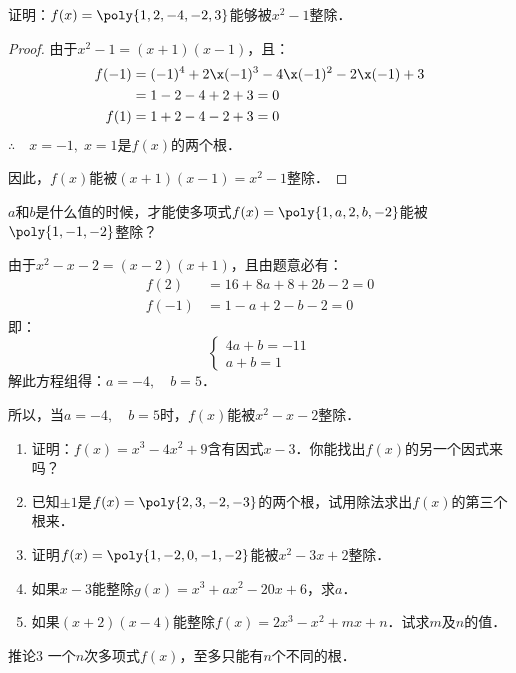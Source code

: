\begin{example}
证明：$f(x)=\poly{1,2,-4,-2,3}$能够被$x^2-1$整除．
\end{example}

\begin{proof}
由于$x^2-1=(x+1)(x-1)$，且：
\[\begin{split}
    f(-1)&=(-1)^4+2\x(-1)^3-4\x(-1)^2-2\x (-1)+3\\
&=1-2-4+2+3=0\\
f(1)&=1+2-4-2+3=0
\end{split}\]
$\therefore\quad x=-1,\; x=1$是$f(x)$的两个根．

因此，$f(x)$能被$(x+1)(x-1)=x^2-1$整除．

\end{proof}

\begin{example}
    $a$和$b$是什么值的时候，才能使多项式$f(x)=\poly{1,a,2,b,-2}$能被$\poly{1,-1,-2}$整除？
\end{example}

\begin{solution}
由于$x^2-x-2=(x-2)(x+1)$，且由题意必有：
\[\begin{split}
    f(2) &= 16+8a+8+2b-2=0\\
    f(-1)&=1-a+2-b-2=0
\end{split}\]
即：\[\begin{cases}
    4a+b=-11\\
    a+b=1
\end{cases}\]
解此方程组得：$a=-4,\quad b=5$．

所以，当$a=-4,\quad b=5$时，$f(x)$能被$x^2-x-2$整除．
\end{solution}

\begin{ex}
\begin{enumerate}
    \item 证明：$f(x)=x^3-4x^2+9$含有因式$x-3$．你能找出$f(x)$的另一个因式来吗？
    \item 已知$\pm 1$是$f(x)=\poly{2,3,-2,-3}$的两个根，试用除法求出$f(x)$的第三个根来．
    \item 证明$f(x)=\poly{1,-2,0,-1,-2}$能被$x^2-3x+2$整除．
    \item 如果$x-3$能整除$g(x)=x^3+ax^2-20x+6$，求$a$．
    \item 如果$(x+2)(x-4)$能整除$f(x)=2x^3-x^2+mx+n$．试求$m$及$n$的值．
\end{enumerate}
\end{ex}

\begin{blk}{推论3}
    一个$n$次多项式$f(x)$，至多只能有$n$个不同的根．
\end{blk}

